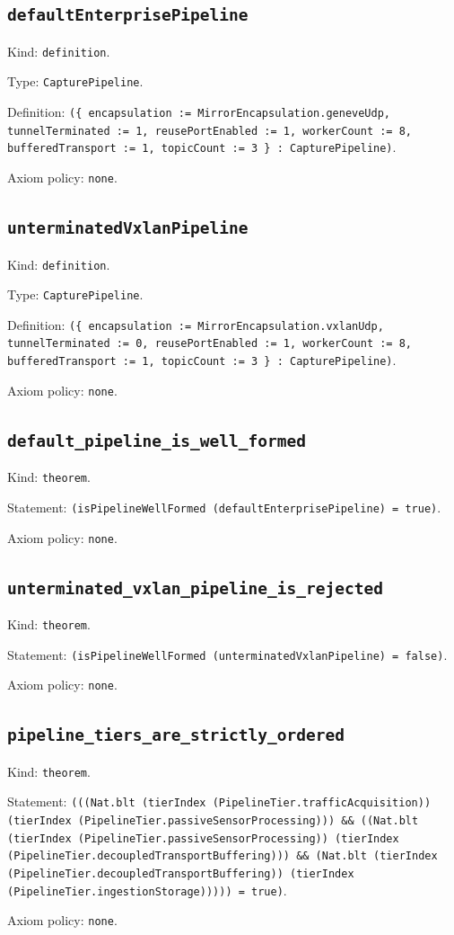 \documentclass[11pt]{article}
\begin{document}
\subsection*{\texttt{defaultEnterprisePipeline}}
\noindent Kind: \texttt{definition}.\par
\noindent Type: \texttt{CapturePipeline}.\par
\noindent Definition: \texttt{(\{ encapsulation := MirrorEncapsulation.geneveUdp, tunnelTerminated := 1, reusePortEnabled := 1, workerCount := 8, bufferedTransport := 1, topicCount := 3 \} : CapturePipeline)}.\par
\noindent Axiom policy: \texttt{none}.\par
\subsection*{\texttt{unterminatedVxlanPipeline}}
\noindent Kind: \texttt{definition}.\par
\noindent Type: \texttt{CapturePipeline}.\par
\noindent Definition: \texttt{(\{ encapsulation := MirrorEncapsulation.vxlanUdp, tunnelTerminated := 0, reusePortEnabled := 1, workerCount := 8, bufferedTransport := 1, topicCount := 3 \} : CapturePipeline)}.\par
\noindent Axiom policy: \texttt{none}.\par
\subsection*{\texttt{default\_pipeline\_is\_well\_formed}}
\noindent Kind: \texttt{theorem}.\par
\noindent Statement: \texttt{(isPipelineWellFormed (defaultEnterprisePipeline) = true)}.\par
\noindent Axiom policy: \texttt{none}.\par
\subsection*{\texttt{unterminated\_vxlan\_pipeline\_is\_rejected}}
\noindent Kind: \texttt{theorem}.\par
\noindent Statement: \texttt{(isPipelineWellFormed (unterminatedVxlanPipeline) = false)}.\par
\noindent Axiom policy: \texttt{none}.\par
\subsection*{\texttt{pipeline\_tiers\_are\_strictly\_ordered}}
\noindent Kind: \texttt{theorem}.\par
\noindent Statement: \texttt{(((Nat.blt (tierIndex (PipelineTier.trafficAcquisition)) (tierIndex (PipelineTier.passiveSensorProcessing))) \&\& ((Nat.blt (tierIndex (PipelineTier.passiveSensorProcessing)) (tierIndex (PipelineTier.decoupledTransportBuffering))) \&\& (Nat.blt (tierIndex (PipelineTier.decoupledTransportBuffering)) (tierIndex (PipelineTier.ingestionStorage))))) = true)}.\par
\noindent Axiom policy: \texttt{none}.\par
\end{document}
